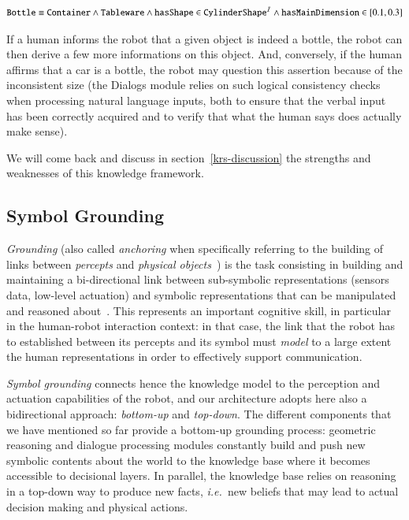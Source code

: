 \documentclass[preprint,3p,times]{elsarticle}
\newcommand{\ie}{{\textit{i.e.\ }}}
\begin{document}
$$
\text{\tt Bottle} \equiv \text{\tt Container} \wedge 
                         \text{\tt Tableware} \wedge
                         \text{\tt hasShape} \in \text{\tt CylinderShape}^{\mathcal{I}} \wedge
                         \text{\tt hasMainDimension} \in [0.1, 0.3]
$$

If a human informs the robot that a given object is indeed a bottle, the robot
can then derive a few more informations on this object. And, conversely, if the
human affirms that a car is a bottle, the robot may question this assertion
because of the inconsistent size (the {\sc Dialogs} module relies on such
logical consistency checks when processing natural language inputs, both to
ensure that the verbal input has been correctly acquired and to verify that what
the human says does actually make sense).

We will come back and discuss in section~\ref{krs-discussion} the strengths and
weaknesses of this knowledge framework.

\subsection{Symbol Grounding}

\emph{Grounding} (also called \emph{anchoring} when specifically referring to
the building of links between \emph{percepts} and \emph{physical
objects}~\cite{Coradeschi2003}) is the task consisting in building and
maintaining a bi-directional link between sub-symbolic representations (sensors
data, low-level actuation) and symbolic representations that can be manipulated
and reasoned about~\cite{Harnad1990}. This represents an important cognitive
skill, in particular in the human-robot interaction context: in that case, the
link that the robot has to established between its percepts and its symbol must
\emph{model} to a large extent the human representations in order to effectively
support communication.

\emph{Symbol grounding} connects hence the knowledge model to the perception and
actuation capabilities of the robot, and our architecture adopts here also a
bidirectional approach: \emph{bottom-up} and \emph{top-down}.  The different
components that we have mentioned so far provide a bottom-up grounding process:
geometric reasoning and dialogue processing modules constantly build and push
new symbolic contents about the world to the knowledge base where it becomes
accessible to decisional layers. In parallel, the knowledge base relies on
reasoning in a top-down way to produce new facts, \ie new beliefs that may lead
to actual decision making and physical actions.
\end{document}
